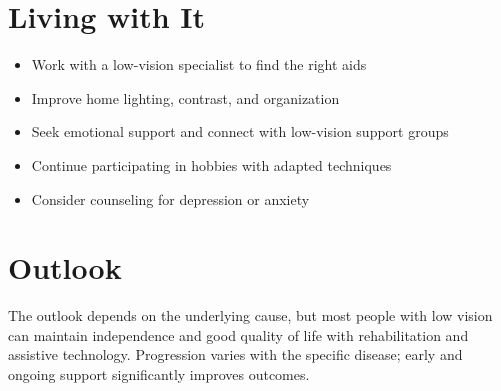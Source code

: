 \section{Living with It}
\begin{itemize}[noitemsep]
  \item Work with a low-vision specialist to find the right aids
  \item Improve home lighting, contrast, and organization
  \item Seek emotional support and connect with low-vision support groups
  \item Continue participating in hobbies with adapted techniques
  \item Consider counseling for depression or anxiety
\end{itemize}
\section{Outlook}
The outlook depends on the underlying cause, but most people with low vision can maintain independence and good quality of life with rehabilitation and assistive technology. Progression varies with the specific disease; early and ongoing support significantly improves outcomes.
